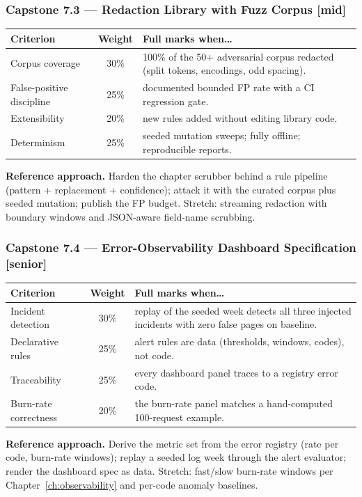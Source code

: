 \subsubsection*{Capstone 7.3 --- Redaction Library with Fuzz Corpus [mid]}
\begin{center}\small
\begin{tabularx}{\textwidth}{l c X}
\toprule
\textbf{Criterion} & \textbf{Weight} & \textbf{Full marks when\ldots} \\
\midrule
Corpus coverage & 30\% & 100\% of the 50+ adversarial corpus redacted (split tokens, encodings, odd spacing). \\
False-positive discipline & 25\% & documented bounded FP rate with a CI regression gate. \\
Extensibility & 20\% & new rules added without editing library code. \\
Determinism & 25\% & seeded mutation sweeps; fully offline; reproducible reports. \\
\bottomrule
\end{tabularx}
\end{center}
\textbf{Reference approach.} Harden the chapter scrubber behind a rule
pipeline (pattern + replacement + confidence); attack it with the curated
corpus plus seeded mutation; publish the FP budget. Stretch: streaming
redaction with boundary windows and JSON-aware field-name scrubbing.

\subsubsection*{Capstone 7.4 --- Error-Observability Dashboard Specification [senior]}
\begin{center}\small
\begin{tabularx}{\textwidth}{l c X}
\toprule
\textbf{Criterion} & \textbf{Weight} & \textbf{Full marks when\ldots} \\
\midrule
Incident detection & 30\% & replay of the seeded week detects all three injected incidents with zero false pages on baseline. \\
Declarative rules & 25\% & alert rules are data (thresholds, windows, codes), not code. \\
Traceability & 25\% & every dashboard panel traces to a registry error code. \\
Burn-rate correctness & 20\% & the burn-rate panel matches a hand-computed 100-request example. \\
\bottomrule
\end{tabularx}
\end{center}
\textbf{Reference approach.} Derive the metric set from the error registry
(rate per code, burn-rate windows); replay a seeded log week through the
alert evaluator; render the dashboard spec as data. Stretch: fast/slow
burn-rate windows per Chapter~\ref{ch:observability} and per-code anomaly
baselines.

